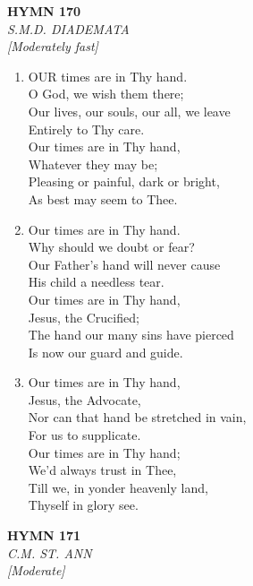 \newpage
\begin{center}
    {\Large \textbf{HYMN 170}}
    \\
    \textit{S.M.D. DIADEMATA}
    \\
    \textit{\small [Moderately fast]}
\end{center}
\vspace{1em}

\begin{enumerate}
    \item OUR times are in Thy hand. \\
        O God, we wish them there; \\
        Our lives, our souls, our all, we leave \\
        Entirely to Thy care. \\
        Our times are in Thy hand, \\
        Whatever they may be; \\
        Pleasing or painful, dark or bright, \\
        As best may seem to Thee.

    \item Our times are in Thy hand. \\
        Why should we doubt or fear? \\
        Our Father's hand will never cause \\
        His child a needless tear. \\
        Our times are in Thy hand, \\
        Jesus, the Crucified; \\
        The hand our many sins have pierced \\
        Is now our guard and guide.

    \item Our times are in Thy hand, \\
        Jesus, the Advocate, \\
        Nor can that hand be stretched in vain, \\
        For us to supplicate. \\
        Our times are in Thy hand; \\
        We'd always trust in Thee, \\
        Till we, in yonder heavenly land, \\
        Thyself in glory see.

\end{enumerate}

\newpage
\begin{center}
    {\Large \textbf{HYMN 171}}
    \\
    \textit{C.M. ST. ANN}
    \\
    \textit{\small [Moderate]}
\end{center}
\vspace{1em}

